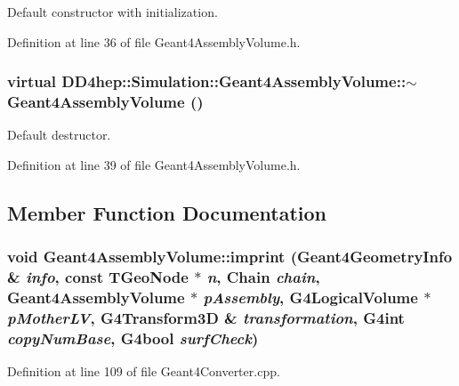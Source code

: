 Default constructor with initialization. 

Definition at line 36 of file Geant4AssemblyVolume.h.\hypertarget{class_d_d4hep_1_1_simulation_1_1_geant4_assembly_volume_a62b2a9ebf445a8482edbe01918d55243}{
\subsubsection[{$\sim$Geant4AssemblyVolume}]{\setlength{\rightskip}{0pt plus 5cm}virtual DD4hep::Simulation::Geant4AssemblyVolume::$\sim$Geant4AssemblyVolume ()}}
\label{class_d_d4hep_1_1_simulation_1_1_geant4_assembly_volume_a62b2a9ebf445a8482edbe01918d55243}


Default destructor. 

Definition at line 39 of file Geant4AssemblyVolume.h.

\subsection{Member Function Documentation}
\hypertarget{class_d_d4hep_1_1_simulation_1_1_geant4_assembly_volume_a5f445612042e1ff7a273e1c2fdb5111b}{
\subsubsection[{imprint}]{\setlength{\rightskip}{0pt plus 5cm}void Geant4AssemblyVolume::imprint ({\bf Geant4GeometryInfo} \& {\em info}, \/  const TGeoNode $\ast$ {\em n}, \/  {\bf Chain} {\em chain}, \/  {\bf Geant4AssemblyVolume} $\ast$ {\em pAssembly}, \/  G4LogicalVolume $\ast$ {\em pMotherLV}, \/  G4Transform3D \& {\em transformation}, \/  G4int {\em copyNumBase}, \/  G4bool {\em surfCheck})}}
\label{class_d_d4hep_1_1_simulation_1_1_geant4_assembly_volume_a5f445612042e1ff7a273e1c2fdb5111b}


Definition at line 109 of file Geant4Converter.cpp.

